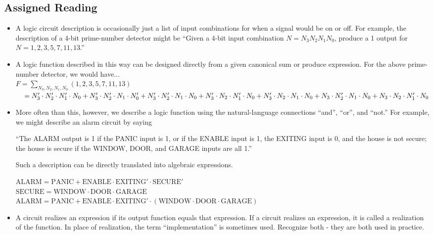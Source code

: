 \documentclass[10pt,a4paper]{article}
\begin{document}
\subsection{Assigned Reading}
\begin{itemize}
\item A logic circuit description is occasionally just a list of input combinations for when a signal would be on or off. For example, the description of a 4-bit prime-number detector might be ``Given a 4-bit input combination $N=N_3N_2N_1N_0$, produce a 1 output for $N=1,2,3,5,7,11,13$.''\pagebreak
\item A logic function described in this way can be designed directly from a given canonical sum or produce expression. For the above prime-number detector, we would have...\\
$F=\sum_{N_3,N_2,N_1,N_0}(1,2,3,5,7,11,13)$\\
$\textcolor{white}{F}=N_3'\cdot N_2'\cdot N_1'\cdot N_0+N_3'\cdot N_2'\cdot N_1\cdot N_0'+N_3'\cdot N_2'\cdot N_1\cdot N_0+N_3'\cdot N_2\cdot N_1'\cdot N_0+N_3'\cdot N_2\cdot N_1\cdot N_0+N_3\cdot N_2'\cdot N_1\cdot N_0+N_3\cdot N_2\cdot N_1'\cdot N_0$
\item More often than this, however, we describe a logic function using the natural-language connections ``and'', ``or'', and ``not.'' For example, we might describe an alarm circuit by saying 
\begin{displayquote}
``The ALARM output is 1 if the PANIC input is 1, or if the ENABLE input is 1, the EXITING input is 0, and the house is not secure; the house is secure if the WINDOW, DOOR, and GARAGE inputs are all 1.''
\end{displayquote}
Such a description can be directly translated into algebraic expressions.
\begin{displayquote}
$\text{ALARM}=\text{PANIC}+\text{ENABLE}\cdot\text{EXITING}'\cdot\text{SECURE}'$\\
$\text{SECURE}=\text{WINDOW}\cdot\text{DOOR}\cdot\text{GARAGE}$\\
$\text{ALARM}=\text{PANIC}+\text{ENABLE}\cdot \text{EXITING}'\cdot(\text{WINDOW}\cdot\text{DOOR}\cdot\text{GARAGE})$
\end{displayquote}
\item A circuit realizes an expression if its output function equals that expression. If a circuit realizes an expression, it is called a realization of the function. In place of realization, the term ``implementation'' is sometimes used. Recognize both - they are both used in practice.

\end{itemize}
\end{document}

